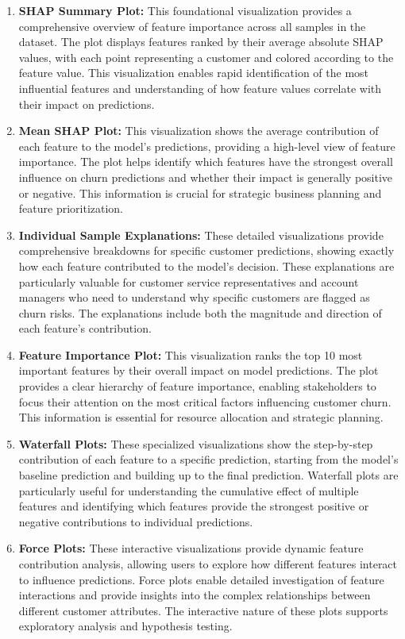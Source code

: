 \documentclass{article}
\begin{document}
\begin{enumerate}
    \item \textbf{SHAP Summary Plot:} This foundational visualization provides a comprehensive overview of feature importance across all samples in the dataset. The plot displays features ranked by their average absolute SHAP values, with each point representing a customer and colored according to the feature value. This visualization enables rapid identification of the most influential features and understanding of how feature values correlate with their impact on predictions.
    
    \item \textbf{Mean SHAP Plot:} This visualization shows the average contribution of each feature to the model's predictions, providing a high-level view of feature importance. The plot helps identify which features have the strongest overall influence on churn predictions and whether their impact is generally positive or negative. This information is crucial for strategic business planning and feature prioritization.
    
    \item \textbf{Individual Sample Explanations:} These detailed visualizations provide comprehensive breakdowns for specific customer predictions, showing exactly how each feature contributed to the model's decision. These explanations are particularly valuable for customer service representatives and account managers who need to understand why specific customers are flagged as churn risks. The explanations include both the magnitude and direction of each feature's contribution.
    
    \item \textbf{Feature Importance Plot:} This visualization ranks the top 10 most important features by their overall impact on model predictions. The plot provides a clear hierarchy of feature importance, enabling stakeholders to focus their attention on the most critical factors influencing customer churn. This information is essential for resource allocation and strategic planning.
    
    \item \textbf{Waterfall Plots:} These specialized visualizations show the step-by-step contribution of each feature to a specific prediction, starting from the model's baseline prediction and building up to the final prediction. Waterfall plots are particularly useful for understanding the cumulative effect of multiple features and identifying which features provide the strongest positive or negative contributions to individual predictions.
    
    \item \textbf{Force Plots:} These interactive visualizations provide dynamic feature contribution analysis, allowing users to explore how different features interact to influence predictions. Force plots enable detailed investigation of feature interactions and provide insights into the complex relationships between different customer attributes. The interactive nature of these plots supports exploratory analysis and hypothesis testing.
\end{enumerate}
\end{document}
